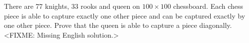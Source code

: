 \problem
There are 77 knights, 33 rooks and queen on $100 \times 100$ chessboard.
Each chess piece is able to capture exactly one other piece and can be captured
exactly by one other piece.
Prove that the queen is able to capture a piece diagonally.
\solution
<FIXME: Missing English solution.>
\endproblem
